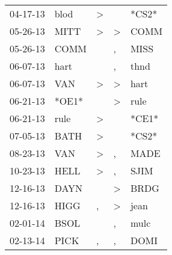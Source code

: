 \begin{supertabular}{p{0.07\textwidth}p{0.06\textwidth}p{0.02\textwidth}p{0.02\textwidth}p{0.06\textwidth}}
          04-17-13\textsuperscript{} &           blod\textsuperscript{} &     \textgreater &                  &                            *CS2* \\
          05-26-13\textsuperscript{} &           MITT\textsuperscript{} &     \textgreater &     \textgreater &           COMM\textsuperscript{} \\
          05-26-13\textsuperscript{} &           COMM\textsuperscript{} &                  &                , &           MISS\textsuperscript{} \\
          06-07-13\textsuperscript{} &           hart\textsuperscript{} &                  &                , &           thnd\textsuperscript{} \\
          06-07-13\textsuperscript{} &            VAN\textsuperscript{} &     \textgreater &     \textgreater &           hart\textsuperscript{} \\
          06-21-13\textsuperscript{} &                            *OE1* &                  &     \textgreater &           rule\textsuperscript{} \\
          06-21-13\textsuperscript{} &           rule\textsuperscript{} &     \textgreater &                  &                            *CE1* \\
          07-05-13\textsuperscript{} &           BATH\textsuperscript{} &     \textgreater &                  &                            *CS2* \\
          08-23-13\textsuperscript{} &            VAN\textsuperscript{} &     \textgreater &                , &           MADE\textsuperscript{} \\
          10-23-13\textsuperscript{} &           HELL\textsuperscript{} &     \textgreater &                , &           SJIM\textsuperscript{} \\
          12-16-13\textsuperscript{} &           DAYN\textsuperscript{} &                  &     \textgreater &           BRDG\textsuperscript{} \\
          12-16-13\textsuperscript{} &           HIGG\textsuperscript{} &                , &     \textgreater &           jean\textsuperscript{} \\
          02-01-14\textsuperscript{} &           BSOL\textsuperscript{} &                  &                , &           mulc\textsuperscript{} \\
          02-13-14\textsuperscript{} &           PICK\textsuperscript{} &                , &                , &           DOMI\textsuperscript{} \\

\end{supertabular}
